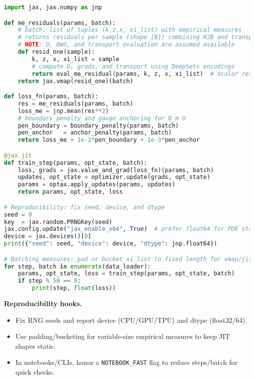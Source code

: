 ﻿\documentclass[11pt,letterpaper,oneside]{article}
\numberwithin{equation}{section}
\newcommand{\1}{\mathbf{1}}
\begin{document}
\begin{lstlisting}[language=Python,caption={Pseudo-JAX training loop for Route B (ME residual minimization)}]
import jax, jax.numpy as jnp

def me_residuals(params, batch):
    # batch: list of tuples (k,z,x, xi_list) with empirical measures
    # returns residuals per sample (shape [B]) combining HJB and transport terms
    # NOTE: U, DmU, and transport evaluation are assumed available
    def resid_one(sample):
        k, z, x, xi_list = sample
        # compute U, grads, and transport using DeepSets encodings
        return eval_me_residual(params, k, z, x, xi_list)  # scalar residual
    return jax.vmap(resid_one)(batch)

def loss_fn(params, batch):
    res = me_residuals(params, batch)
    loss_me = jnp.mean(res**2)
    # boundary penalty and gauge anchoring for D_m U
    pen_boundary = boundary_penalty(params, batch)
    pen_anchor   = anchor_penalty(params, batch)
    return loss_me + 1e-2*pen_boundary + 1e-3*pen_anchor

@jax.jit
def train_step(params, opt_state, batch):
    loss, grads = jax.value_and_grad(loss_fn)(params, batch)
    updates, opt_state = optimizer.update(grads, opt_state)
    params = optax.apply_updates(params, updates)
    return params, opt_state, loss

# Reproducibility: fix seed, device, and dtype
seed = 0
key  = jax.random.PRNGKey(seed)
jax.config.update("jax_enable_x64", True)  # prefer float64 for PDE stability
device = jax.devices()[0]
print({"seed": seed, "device": device, "dtype": jnp.float64})

# Batching measures: pad or bucket xi_list to fixed length for vmap/jit
for step, batch in enumerate(data_loader):
    params, opt_state, loss = train_step(params, opt_state, batch)
    if step % 50 == 0:
        print(step, float(loss))
\end{lstlisting}

\begin{tcolorbox}[didacticstyle]
\textbf{Reproducibility hooks.}
\begin{itemize}[leftmargin=1.1em,itemsep=0.25em]
  \item Fix RNG seeds and report device (CPU/GPU/TPU) and dtype (float32/64).
  \item Use padding/bucketing for variable-size empirical measures to keep JIT shapes static.
  \item In notebooks/CLIs, honor a \texttt{NOTEBOOK\_FAST} flag to reduce steps/batch for quick checks.
\end{itemize}
\end{tcolorbox}
\end{document}
